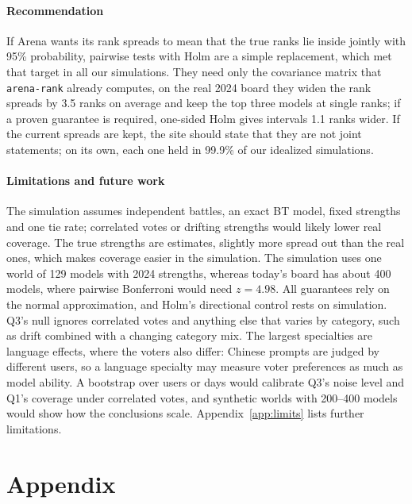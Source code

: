 \documentclass[12pt]{article}
\begin{document}
\paragraph{Recommendation} If Arena wants its rank spreads to mean that the true ranks lie inside jointly with 95\% probability, pairwise tests with Holm are a simple replacement, which met that target in all our simulations. They need only the covariance matrix that \texttt{arena-rank} already computes, on the real 2024 board they widen the rank spreads by 3.5 ranks on average and keep the top three models at single ranks; if a proven guarantee is required, one-sided Holm gives intervals 1.1 ranks wider. If the current spreads are kept, the site should state that they are not joint statements; on its own, each one held in 99.9\% of our idealized simulations.

\paragraph{Limitations and future work} The simulation assumes independent battles, an exact BT model, fixed strengths and one tie rate; correlated votes or drifting strengths would likely lower real coverage. The true strengths are estimates, slightly more spread out than the real ones, which makes coverage easier in the simulation. The simulation uses one world of 129 models with 2024 strengths, whereas today's board has about 400 models, where pairwise Bonferroni would need $z = 4.98$. All guarantees rely on the normal approximation, and Holm's directional control rests on simulation. Q3's null ignores correlated votes and anything else that varies by category, such as drift combined with a changing category mix. The largest specialties are language effects, where the voters also differ: Chinese prompts are judged by different users, so a language specialty may measure voter preferences as much as model ability. A bootstrap over users or days would calibrate Q3's noise level and Q1's coverage under correlated votes, and synthetic worlds with 200--400 models would show how the conclusions scale. Appendix~\ref{app:limits} lists further limitations.

\clearpage
\begingroup\footnotesize\setlength{\bibsep}{3pt}


\endgroup

\clearpage
\appendix
\small
\section*{Appendix}
\renewcommand{\thesubsection}{\Alph{subsection}}
\setcounter{figure}{0}
\setcounter{table}{0}
\end{document}
